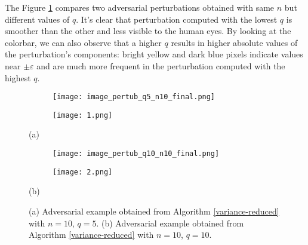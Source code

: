 The Figure \ref{fig:vred} compares two adversarial perturbations obtained with same $n$ but different values of $q$. It's clear that perturbation computed with the lowest $q$ is smoother than the other and less visible to the human eyes. By looking at the colorbar, we can also observe that a higher $q$ results in higher absolute values of the perturbation's components: bright yellow and dark blue pixels indicate values near $\pm\varepsilon$ and are much more frequent in the perturbation computed with the highest $q$.
\begin{figure}%
	\begin{subfigure}[b]{0.15\textwidth}
		\texttt{[image: image\_pertub\_q5\_n10\_final.png]}
	\end{subfigure}
	\hspace{2.5cm}
	\begin{subfigure}[b]{0.15\textwidth}
		\texttt{[image: 1.png]}
	\end{subfigure}
	\newline
	\centerline{(a)}
	\begin{subfigure}[b]{0.15\textwidth}
		\texttt{[image: image\_pertub\_q10\_n10\_final.png]}
	\end{subfigure}
	\hspace{2.5cm}
	\begin{subfigure}[b]{0.15\textwidth}
		\texttt{[image: 2.png]}
	\end{subfigure}
	\newline
	\centerline{(b)}
	\caption{(a) Adversarial example obtained from Algorithm \ref{variance-reduced} with $n=10$, $q=5$. (b) Adversarial example obtained from Algorithm \ref{variance-reduced} with $n=10$, $q=10$.  }
	\label{fig:vred}
\end{figure}

